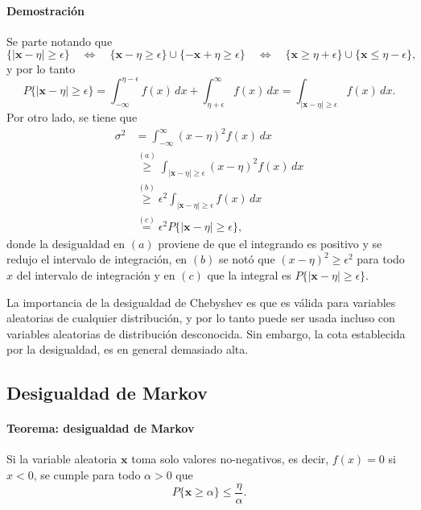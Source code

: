 \documentclass[a4paper]{report}
\newcommand{\x}{\mathbf{x}}
\begin{document}
\paragraph{Demostración} Se parte notando que
\[
 \{|\x-\eta|\geq\epsilon\} \quad \Leftrightarrow \quad \{\x-\eta\geq\epsilon\}\cup\{-\x+\eta\geq\epsilon\} 
 \quad \Leftrightarrow \quad \{\x\geq\eta+\epsilon\}\cup\{\x\leq\eta-\epsilon\},
\]
y por lo tanto
\[
 P\{|\x-\eta|\geq\epsilon\}=\int_{-\infty}^{\eta-\epsilon}f(x)\,dx+\int_{\eta+\epsilon}^{\infty}f(x)\,dx=\int_{|\x-\eta|\geq\epsilon}f(x)\,dx.
\]
Por otro lado, se tiene que
\begin{align*}
 \sigma^2&=\int_{-\infty}^{\infty}(x-\eta)^2f(x)\,dx\\
   &\overset{(a)}{\geq}\int_{|\x-\eta|\geq\epsilon}(x-\eta)^2f(x)\,dx\\
   &\overset{(b)}{\geq}\epsilon^2\int_{|\x-\eta|\geq\epsilon}f(x)\,dx\\
   &\overset{(c)}{=}\epsilon^2P\{|\x-\eta|\geq\epsilon\},
\end{align*}
donde la desigualdad en \((a)\) proviene de que el integrando es positivo y se redujo el intervalo de integración, en \((b)\) se notó que \((x-\eta)^2\geq\epsilon^2\) para todo \(x\) del intervalo de integración y en \((c)\) que la integral es \(P\{|\x-\eta|\geq\epsilon\}\).

La importancia de la desigualdad de Chebyshev es que es válida para variables aleatorias de cualquier distribución, y por lo tanto puede ser usada incluso con variables aleatorias de distribución desconocida. Sin embargo, la cota establecida por la desigualdad, es en general demasiado alta.

\subsection{Desigualdad de Markov}

\paragraph{Teorema: desigualdad de Markov} Si la variable aleatoria \(\x\) toma solo valores no-negativos, es decir, \(f(x)=0\) si \(x<0\), se cumple para todo \(\alpha>0\) que
\begin{equation}\label{eq:markov_inequality}
 P\{\x\geq\alpha\}\leq\frac{\eta}{\alpha}.
\end{equation}
\end{document}
